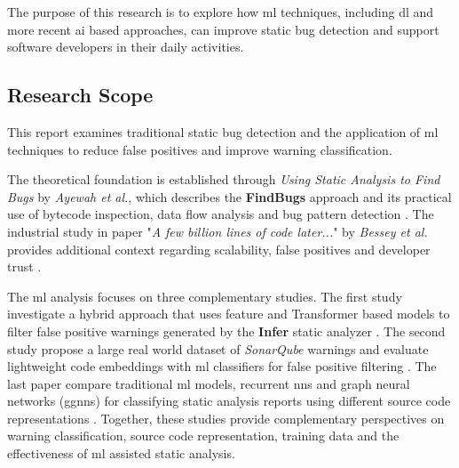 \hspace{0.6em} The purpose of this research is to explore how \gls{ml} techniques, including \gls{dl} and more recent \gls{ai} based approaches, can improve static bug detection and support software developers in their daily activities. 



\subsection{Research Scope}

\hspace{0.6em} This report examines traditional static bug detection and the application of \gls{ml} techniques to reduce false positives and improve warning classification.

\hspace{0.6em} The theoretical foundation is established through \textit{Using Static Analysis to Find Bugs} by \textit{Ayewah et al.}, which describes the \textbf{FindBugs} approach and its practical use of bytecode inspection, data flow analysis and bug pattern detection \cite{paperreference1_ayewah2008using}. The industrial study in paper "\textit{A few billion lines of code later...}" by \textit{Bessey et al.} provides additional context regarding scalability, false positives and developer trust \cite{paperreference2_bessey2010few}.

\hspace{0.6em} The \gls{ml} analysis focuses on three complementary studies. The first study investigate a hybrid approach that uses feature and Transformer based models to filter false positive warnings generated by the \textbf{Infer} \cite{meta_infer} static analyzer \cite{paper1_kharkarlearning2022}. The second study propose a large real world dataset of \textit{SonarQube} \cite{sonarqube_docs} warnings and evaluate lightweight code embeddings with \gls{ml} classifiers for false positive filtering \cite{paper2_hegedHus2022static}. The last paper compare traditional \gls{ml} models, recurrent \gls{nns} and graph neural networks (\gls{ggnns}) for classifying static analysis reports using different source code representations 
\cite{paper3_yerramreddy2023empirical}. Together, these studies provide complementary perspectives on warning classification, source code representation, training data and the effectiveness of \gls{ml} assisted static analysis.
